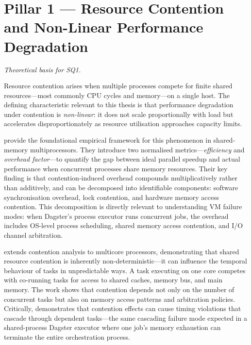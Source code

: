 
\section{Pillar 1 --- Resource Contention and Non-Linear Performance Degradation}
\label{sec:pillar1}

\emph{Theoretical basis for SQ1.}

Resource contention arises when multiple processes compete for finite shared resources---most commonly CPU cycles and memory---on a single host. The defining characteristic relevant to this thesis is that performance degradation under contention is \emph{non-linear}: it does not scale proportionally with load but accelerates disproportionately as resource utilisation approaches capacity limits.

\citet{nanda1991} provide the foundational empirical framework for this phenomenon in shared-memory multiprocessors. They introduce two normalised metrics---\emph{efficiency} and \emph{overhead factor}---to quantify the gap between ideal parallel speedup and actual performance when concurrent processes share memory resources. Their key finding is that contention-induced overhead compounds multiplicatively rather than additively, and can be decomposed into identifiable components: software synchronisation overhead, lock contention, and hardware memory access contention. This decomposition is directly relevant to understanding VM failure modes: when Dagster's process executor runs concurrent jobs, the overhead includes OS-level process scheduling, shared memory access contention, and I/O channel arbitration.

\citet{arora2023} extends contention analysis to multicore processors, demonstrating that shared resource contention is inherently non-deterministic---it can influence the temporal behaviour of tasks in unpredictable ways. A task executing on one core competes with co-running tasks for access to shared caches, memory bus, and main memory. The work shows that contention depends not only on the number of concurrent tasks but also on memory access patterns and arbitration policies. Critically, \citeauthor{arora2023} demonstrates that contention effects can cause timing violations that cascade through dependent tasks---the same cascading failure mode expected in a shared-process Dagster executor where one job's memory exhaustion can terminate the entire orchestration process.

